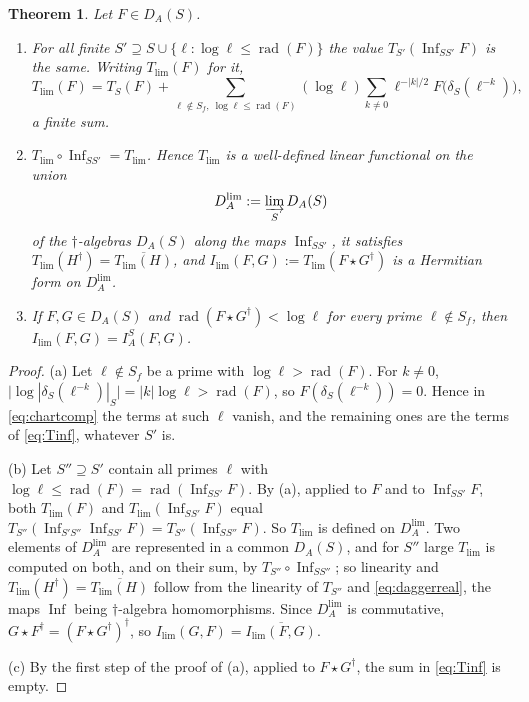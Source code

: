 \documentclass[11pt]{amsart}
\newtheorem{theorem}{Theorem}[section]
\theoremstyle{definition}
\theoremstyle{remark}
\newcommand{\Inf}{\operatorname{Inf}}
\newcommand{\DA}{D_A}
\begin{document}
\begin{theorem}\label{thm:colimtrace}
Let $F\in\DA(S)$.
\begin{enumerate}
\item[(a)] For all finite $S'\supseteq
S\cup\{\ell:\log\ell\le\operatorname{rad}(F)\}$ the value
$T_{S'}(\Inf_{SS'}F)$ is the same.  Writing $T_{\lim}(F)$ for it,
\begin{equation}\label{eq:Tinf}
T_{\lim}(F)=T_S(F)+\sum_{\ell\notin S_f,\ \log\ell\le\operatorname{rad}(F)}
(\log\ell)\sum_{k\ne0}\ell^{-|k|/2}F\bigl(\delta_S(\ell^{-k})\bigr),
\end{equation}
a finite sum.
\item[(b)] $T_{\lim}\circ\Inf_{SS'}=T_{\lim}$.  Hence $T_{\lim}$ is a
well-defined linear functional on the union
\begin{equation}\label{eq:colim}
\DA^{\lim}:=\varinjlim_{S}\DA(S)
\end{equation}
of the $\dagger$-algebras $\DA(S)$ along the maps $\Inf_{SS'}$, it satisfies
$T_{\lim}(H^{\dagger})=\overline{T_{\lim}(H)}$, and
$I_{\lim}(F,G):=T_{\lim}(F\star G^{\dagger})$ is a Hermitian form on
$\DA^{\lim}$.
\item[(c)] If $F,G\in\DA(S)$ and
$\operatorname{rad}(F\star G^{\dagger})<\log\ell$ for every prime
$\ell\notin S_f$, then $I_{\lim}(F,G)=I_A^{S}(F,G)$.
\end{enumerate}
\end{theorem}

\begin{proof}
(a)  Let $\ell\notin S_f$ be a prime with $\log\ell>\operatorname{rad}(F)$.
For $k\ne0$,
$\bigl|\log|\delta_S(\ell^{-k})|_S\bigr|=|k|\log\ell>\operatorname{rad}(F)$,
so $F(\delta_S(\ell^{-k}))=0$.  Hence in \eqref{eq:chartcomp} the terms at
such $\ell$ vanish, and the remaining ones are the terms of \eqref{eq:Tinf},
whatever $S'$ is.

(b)  Let $S''\supseteq S'$ contain all primes $\ell$ with
$\log\ell\le\operatorname{rad}(F)=\operatorname{rad}(\Inf_{SS'}F)$.  By (a),
applied to $F$ and to $\Inf_{SS'}F$, both $T_{\lim}(F)$ and
$T_{\lim}(\Inf_{SS'}F)$ equal
$T_{S''}(\Inf_{S'S''}\Inf_{SS'}F)=T_{S''}(\Inf_{SS''}F)$.  So $T_{\lim}$ is
defined on $\DA^{\lim}$.  Two elements of $\DA^{\lim}$ are represented in
a common $\DA(S)$, and for $S''$ large $T_{\lim}$ is computed on both, and on
their sum, by $T_{S''}\circ\Inf_{SS''}$; so linearity and
$T_{\lim}(H^{\dagger})=\overline{T_{\lim}(H)}$ follow from the linearity of
$T_{S''}$ and \eqref{eq:daggerreal}, the maps $\Inf$ being $\dagger$-algebra
homomorphisms.  Since $\DA^{\lim}$ is commutative,
$G\star F^{\dagger}=(F\star G^{\dagger})^{\dagger}$, so
$I_{\lim}(G,F)=\overline{I_{\lim}(F,G)}$.

(c)  By the first step of the proof of (a), applied to $F\star G^{\dagger}$,
the sum in \eqref{eq:Tinf} is empty.
\end{proof}
\end{document}
